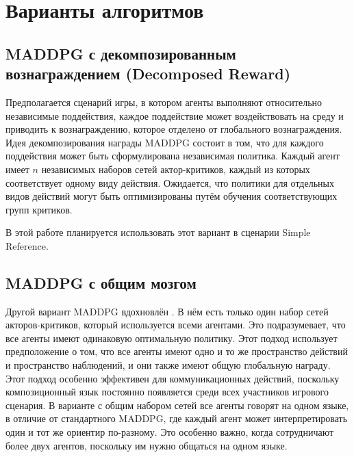 \section{Варианты алгоритмов}

\subsection{MADDPG с декомпозированным вознаграждением (Decomposed Reward)}

Предполагается сценарий игры, в котором агенты выполняют относительно независимые поддействия, каждое поддействие может воздействовать на среду и приводить к вознаграждению, которое отделено от глобального вознаграждения. Идея декомпозирования награды MADDPG состоит в том, что для каждого поддействия может быть сформулирована независимая политика. Каждый агент имеет $n$ независимых наборов сетей актор-критиков, каждый из которых соответствует одному виду действия. Ожидается, что политики для отдельных видов действий могут быть оптимизированы путём обучения соответствующих групп критиков.

В этой работе планируется использовать этот вариант в сценарии Simple Reference.

\subsection{MADDPG с общим мозгом}

Другой вариант MADDPG вдохновлён \cite{mordatch2017emergence}. В нём есть только один набор сетей акторов-критиков, который используется всеми агентами. Это подразумевает, что все агенты имеют одинаковую оптимальную политику. Этот подход использует предположение о том, что все агенты имеют одно и то же пространство действий и пространство наблюдений, и они также имеют общую глобальную награду. Этот подход особенно эффективен для коммуникационных действий, поскольку композиционный язык постоянно появляется среди всех участников игрового сценария. В варианте с общим набором сетей все агенты говорят на одном языке, в отличие от стандартного MADDPG, где каждый агент может интерпретировать один и тот же ориентир по-разному. Это особенно важно, когда сотрудничают более двух агентов, поскольку им нужно общаться на одном языке.
